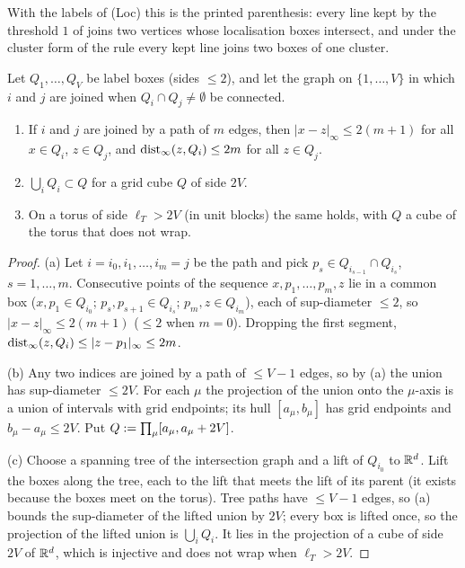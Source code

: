 With the labels of (Loc) this is the printed parenthesis: every line kept by the threshold $1$ of \cite[p.~432]{Ba3} joins two vertices whose localisation boxes intersect, and under the cluster form of the rule every kept line joins two boxes of one cluster.

\begin{lemma}\label{sup3:lem:S112}
Let $Q_1,\dots,Q_V$ be label boxes (sides $\le2$), and let the graph on $\{1,\dots,V\}$ in which $i$ and $j$ are joined when $Q_i\cap Q_j\ne\emptyset$ be connected.
\begin{enumerate}[label=\textup{(\alph*)},nosep,leftmargin=*]
\item If $i$ and $j$ are joined by a path of $m$ edges, then $|x-z|_\infty\le2(m+1)$ for all $x\in Q_i$, $z\in Q_j$, and $\operatorname{dist}_\infty(z,Q_i)\le2m$ for all $z\in Q_j$.
\item $\bigcup_iQ_i\subset Q$ for a grid cube $Q$ of side $2V$.
\item On a torus of side $\ell_T>2V$ (in unit blocks) the same holds, with $Q$ a cube of the torus that does not wrap.
\end{enumerate}
\end{lemma}

\begin{proof}
(a) Let $i=i_0,i_1,\dots,i_m=j$ be the path and pick $p_s\in Q_{i_{s-1}}\cap Q_{i_s}$, $s=1,\dots,m$. Consecutive points of the sequence $x,p_1,\dots,p_m,z$ lie in a common box ($x,p_1\in Q_{i_0}$; $p_s,p_{s+1}\in Q_{i_s}$; $p_m,z\in Q_{i_m}$), each of sup-diameter $\le2$, so $|x-z|_\infty\le2(m+1)$ ($\le2$ when $m=0$). Dropping the first segment, $\operatorname{dist}_\infty(z,Q_i)\le|z-p_1|_\infty\le2m$.

(b) Any two indices are joined by a path of $\le V-1$ edges, so by (a) the union has sup-diameter $\le2V$. For each $\mu$ the projection of the union onto the $\mu$-axis is a union of intervals with grid endpoints; its hull $[a_\mu,b_\mu]$ has grid endpoints and $b_\mu-a_\mu\le2V$. Put $Q:=\prod_\mu[a_\mu,a_\mu+2V]$.

(c) Choose a spanning tree of the intersection graph and a lift of $Q_{i_0}$ to $\mathbb R^d$. Lift the boxes along the tree, each to the lift that meets the lift of its parent (it exists because the boxes meet on the torus). Tree paths have $\le V-1$ edges, so (a) bounds the sup-diameter of the lifted union by $2V$; every box is lifted once, so the projection of the lifted union is $\bigcup_iQ_i$. It lies in the projection of a cube of side $2V$ of $\mathbb R^d$, which is injective and does not wrap when $\ell_T>2V$.
\end{proof}

